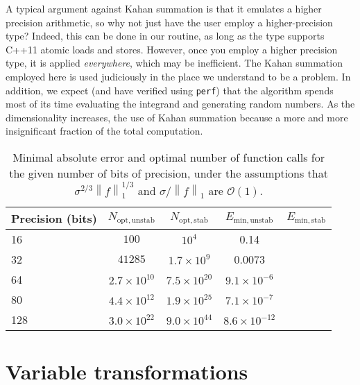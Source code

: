 \documentclass{ansarticle}
\begin{document}
A typical argument against Kahan summation is that it emulates a higher precision arithmetic, so why not just have the user employ a higher-precision type? Indeed, this can be done in our routine, as long as the type supports C++11 atomic loads and stores.
However, once you employ a higher precision type, it is applied \emph{everywhere}, which may be inefficient.
The Kahan summation employed here is used judiciously in the place we understand to be a problem.
In addition, we expect (and have verified using \texttt{perf}) that the algorithm spends most of its time evaluating the integrand and generating random numbers.
As the dimensionality increases, the use of Kahan summation because a more and more insignificant fraction of the total computation.

\begin{table}
  \begin{center}
    \begin{tabular}{lcccc}
      \toprule
   Precision (bits)  & $N_{\mathrm{opt, unstab}}$ &  $N_{\mathrm{opt, stab}}$ & $E_{\mathrm{min, unstab}}$ & $E_{\mathrm{min, stab}}$  \\
      \hline
      16 & $100$                                                     &  $10^4$                              & 0.14  & \\
      32 & $41285$                                                 &  $1.7\times 10^{9}$                              & 0.0073   & \\
      64 & $2.7\times 10^{10}$                               &  $7.5 \times 10^{20}$                             &  $9.1\times 10^{-6}$ & \\
      80 & $4.4\times 10^{12}$                               &  $1.9\times 10^{25}$                              & $7.1\times 10^{-7}$   & \\
      128 & $3.0\times 10^{22}$                             &  $9.0\times 10^{44}$                             & $8.6\times 10^{-12}$  & \\
      \bottomrule
    \end{tabular}
  \end{center}
    \caption{Minimal absolute error and optimal number of function calls for the given number of bits of precision, under the assumptions that $\sigma^{2/3}\left\|f\right\|_{1}^{1/3}$ and $\sigma/\left\|f\right\|_1$ are $\mathcal{O}(1)$.}
    \label{tab:errorestimates}
\end{table}


\section{Variable transformations}
\end{document}
